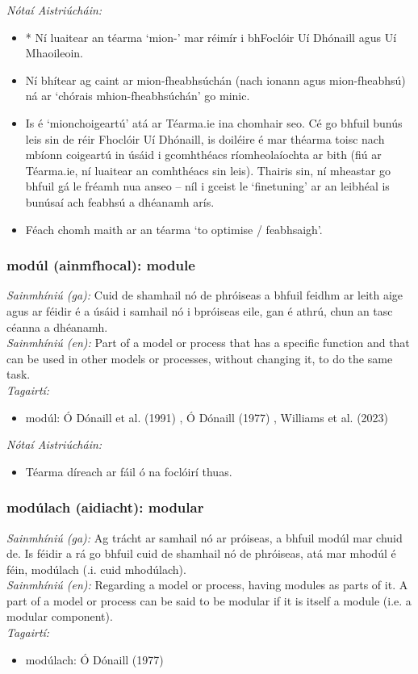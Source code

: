  \noindent \textit{Nótaí Aistriúcháin:}
\begin{itemize}
	\item * Ní luaitear an téarma `mion-' mar réimír i bhFoclóir Uí Dhónaill agus Uí Mhaoileoin.
	\item Ní bhítear ag caint ar mion-fheabhsúchán (nach ionann agus mion-fheabhsú) ná ar `chórais mhion-fheabhsúchán' go minic.
	\item Is é `mionchoigeartú' atá ar Téarma.ie ina chomhair seo. Cé go bhfuil bunús leis sin de réir Fhoclóir Uí Dhónaill, is doiléire é mar théarma toisc nach mbíonn coigeartú in úsáid i gcomhthéacs ríomheolaíochta ar bith (fiú ar Téarma.ie, ní luaitear an comhthéacs sin leis). Thairis sin, ní mheastar go bhfuil gá le fréamh nua anseo -- níl i gceist le `finetuning' ar an leibhéal is bunúsaí ach feabhsú a dhéanamh arís.
	\item Féach chomh maith ar an téarma `to optimise / feabhsaigh'.
\end{itemize}


\subsubsection*{modúl (ainmfhocal): module}
 \noindent \textit{Sainmhíniú (ga):} Cuid de shamhail nó de phróiseas a bhfuil feidhm ar leith aige agus ar féidir é a úsáid i samhail nó i bpróiseas eile, gan é athrú, chun an tasc céanna a dhéanamh.
\\
 \noindent \textit{Sainmhíniú (en):} Part of a model or process that has a specific function and that can be used in other models or processes, without changing it, to do the same task.
\\
 \noindent \textit{Tagairtí:}
\begin{itemize}
	\item modúl: Ó Dónaill et al. (1991) \cite{focloir-beag}, Ó Dónaill (1977) \cite{odonaill}, Williams et al. (2023) \cite{storchiste}
\end{itemize}

 \noindent \textit{Nótaí Aistriúcháin:}
\begin{itemize}
	\item Téarma díreach ar fáil ó na foclóirí thuas.
\end{itemize}


\subsubsection*{modúlach (aidiacht): modular}
 \noindent \textit{Sainmhíniú (ga):} Ag trácht ar samhail nó ar próiseas, a bhfuil modúl mar chuid de. Is féidir a rá go bhfuil cuid de shamhail nó de phróiseas, atá mar mhodúl é féin, modúlach (.i. cuid mhodúlach).
\\
 \noindent \textit{Sainmhíniú (en):} Regarding a model or process, having modules as parts of it. A part of a model or process can be said to be modular if it is itself a module (i.e. a modular component).
\\
 \noindent \textit{Tagairtí:}
\begin{itemize}
	\item modúlach: Ó Dónaill (1977) \cite{odonaill}
\end{itemize}

